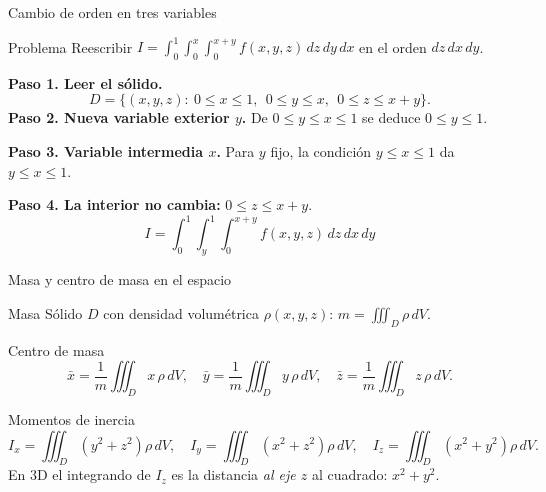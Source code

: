\documentclass[11pt,aspectratio=169]{beamer}
\begin{document}
\begin{frame}{Cambio de orden en tres variables}
  \begin{block}{Problema}
    Reescribir $\displaystyle I=\int_0^1\!\!\int_0^x\!\!\int_0^{x+y} f(x,y,z)\,dz\,dy\,dx$ en el orden $dz\,dx\,dy$.
  \end{block}
  \pause
  \textbf{Paso 1. Leer el sólido.}
  \[
    D=\{(x,y,z):\ 0\le x\le1,\ \ 0\le y\le x,\ \ 0\le z\le x+y\}.
  \]
  \pause
  \textbf{Paso 2. Nueva variable exterior $y$.} De $0\le y\le x\le1$ se deduce $0\le y\le 1$.
  \pause

  \textbf{Paso 3. Variable intermedia $x$.} Para $y$ fijo, la condición $y\le x\le1$ da $y\le x\le 1$.
  \pause

  \textbf{Paso 4. La interior no cambia:} $0\le z\le x+y$.
  \pause
  \[
    \boxed{I=\int_0^1\!\!\int_y^1\!\!\int_0^{x+y} f(x,y,z)\,dz\,dx\,dy}
  \]
\end{frame}

\begin{frame}{Masa y centro de masa en el espacio}
  \begin{block}{Masa}
    Sólido $D$ con densidad volumétrica $\rho(x,y,z)$:\quad
    $\displaystyle m=\iiint_D \rho\,dV$.
  \end{block}
  \pause
  \begin{block}{Centro de masa}
    {\small\[
      \bar x=\frac1m\iiint_D x\,\rho\,dV,\quad
      \bar y=\frac1m\iiint_D y\,\rho\,dV,\quad
      \bar z=\frac1m\iiint_D z\,\rho\,dV.
    \]}
  \end{block}
  \pause
  \begin{block}{Momentos de inercia}
    {\small\[
      I_x=\iiint_D (y^2+z^2)\rho\,dV,\quad
      I_y=\iiint_D (x^2+z^2)\rho\,dV,\quad
      I_z=\iiint_D (x^2+y^2)\rho\,dV.
    \]}
    {\small\color{gray60} En 3D el integrando de $I_z$ es la distancia \emph{al eje $z$} al cuadrado: $x^2+y^2$.}
  \end{block}
\end{frame}

\end{document}

